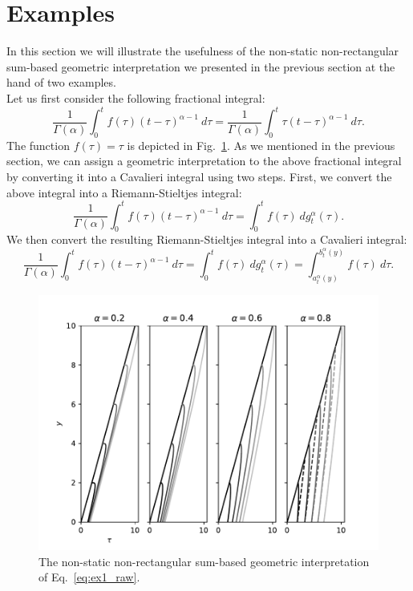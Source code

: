 \documentclass{article}
\theoremstyle{theorem}
\theoremstyle{definition}
\begin{document}
\section{Examples}
In this section we will illustrate the usefulness of the non-static non-rectangular sum-based geometric interpretation we presented in the previous section at the 
hand of two examples.\\

\noindent
Let us first consider the following fractional integral:
\begin{equation}
\label{eq:ex1_raw}
\frac{1}{\Gamma(\alpha)}\int_0^t f(\tau) (t-\tau)^{\alpha-1}~d\tau = \frac{1}{\Gamma(\alpha)}\int_0^t \tau(t-\tau)^{\alpha-1}~d\tau. 
\end{equation}
The function $f(\tau) =\tau$ is depicted in Fig.~\ref{fig:geo1}. As we mentioned in the previous section, we can assign a geometric interpretation to the above fractional integral by converting it into a Cavalieri integral using two steps. First, we convert 
the above integral into a Riemann-Stieltjes integral:
\begin{equation}
\frac{1}{\Gamma(\alpha)}\int_0^t f(\tau) (t-\tau)^{\alpha-1}~d\tau = \int_0^t f(\tau)~dg_t^{\alpha}(\tau). 
\end{equation}
We then convert the resulting Riemann-Stieltjes integral into a Cavalieri integral:
\begin{equation}
\label{eq:ex1}
\frac{1}{\Gamma(\alpha)}\int_0^t f(\tau) (t-\tau)^{\alpha-1}~d\tau = \int_0^t f(\tau)~dg_t^{\alpha}(\tau)=\int_{a_t^{\alpha}(y)}^{b_t^{\alpha}(y)} f(\tau)~d\tau. 
\end{equation}

\begin{figure}[htb]
\centering
\includegraphics[width=1\textwidth]{geo_int1.pdf}
\caption{The non-static non-rectangular sum-based geometric interpretation of Eq.~\eqref{eq:ex1_raw}.}
\label{fig:geo1}
\end{figure}
\end{document}
